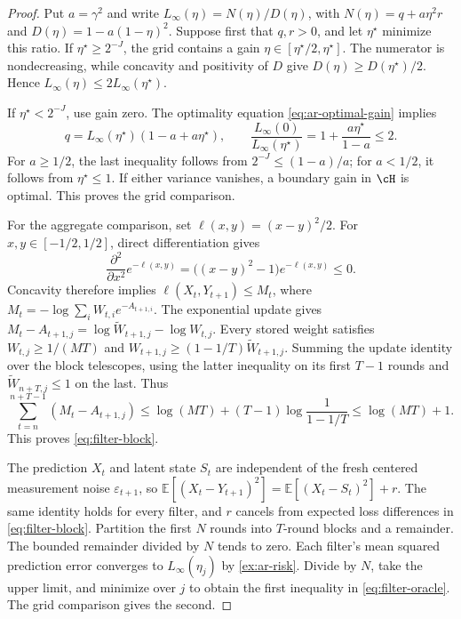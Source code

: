 \documentclass[11pt,twoside]{article}
\newcommand{\E}{\mathbb E}
\theoremstyle{definition}
\theoremstyle{remark}
\begin{document}
\begin{proof}
Put $a=\gamma^2$ and write
$L_\infty(\eta)=N(\eta)/D(\eta)$, with
$N(\eta)=q+a\eta^2r$ and $D(\eta)=1-a(1-\eta)^2$.
Suppose first that $q,r>0$, and let $\eta^\star$ minimize this ratio.
If $\eta^\star\ge2^{-J}$, the grid contains a gain
$\eta\in[\eta^\star/2,\eta^\star]$.
The numerator is nondecreasing, while concavity and positivity of $D$
give $D(\eta)\ge D(\eta^\star)/2$.
Hence $L_\infty(\eta)\le2L_\infty(\eta^\star)$.

If $\eta^\star<2^{-J}$, use gain zero. The optimality equation
\cref{eq:ar-optimal-gain} implies
\[
 q=L_\infty(\eta^\star)(1-a+a\eta^\star),\qquad
 \frac{L_\infty(0)}{L_\infty(\eta^\star)}
 =1+\frac{a\eta^\star}{1-a}\le2.
\]
For $a\ge1/2$, the last inequality follows from
$2^{-J}\le(1-a)/a$; for $a<1/2$, it follows from $\eta^\star\le1$.
If either variance vanishes, a boundary gain in $\cH$ is optimal.
This proves the grid comparison.

For the aggregate comparison, set $\ell(x,y)=(x-y)^2/2$.
For $x,y\in[-1/2,1/2]$, direct differentiation gives
\[
 \frac{\partial^2}{\partial x^2}e^{-\ell(x,y)}
 =\bigl((x-y)^2-1\bigr)e^{-\ell(x,y)}\le0.
\]
Concavity therefore implies
$\ell(X_t,Y_{t+1})\le M_t$, where
$M_t=-\log\sum_iW_{t,i}e^{-A_{t+1,i}}$.
The exponential update gives
$M_t-A_{t+1,j}=\log\widetilde W_{t+1,j}-\log W_{t,j}$.
Every stored weight satisfies $W_{t,j}\ge1/(MT)$ and
$W_{t+1,j}\ge(1-1/T)\widetilde W_{t+1,j}$.
Summing the update identity over the block telescopes, using the latter
inequality on its first $T-1$ rounds and
$\widetilde W_{n+T,j}\le1$ on the last. Thus
\[
 \sum_{t=n}^{n+T-1}(M_t-A_{t+1,j})
 \le\log(MT)+(T-1)\log\frac1{1-1/T}\le\log(MT)+1.
\]
This proves \cref{eq:filter-block}.

The prediction $X_t$ and latent state $S_t$ are independent of the fresh
centered measurement noise $\varepsilon_{t+1}$, so
$\E[(X_t-Y_{t+1})^2]=\E[(X_t-S_t)^2]+r$.
The same identity holds for every filter, and $r$ cancels from expected
loss differences in \cref{eq:filter-block}.
Partition the first $N$ rounds into $T$-round blocks and a remainder.
The bounded remainder divided by $N$ tends to zero. Each filter's mean
squared prediction error converges to $L_\infty(\eta_j)$ by
\cref{ex:ar-risk}. Divide by $N$, take the upper limit, and minimize over
$j$ to obtain the first inequality in \cref{eq:filter-oracle}.
The grid comparison gives the second.
\end{proof}
\end{document}
